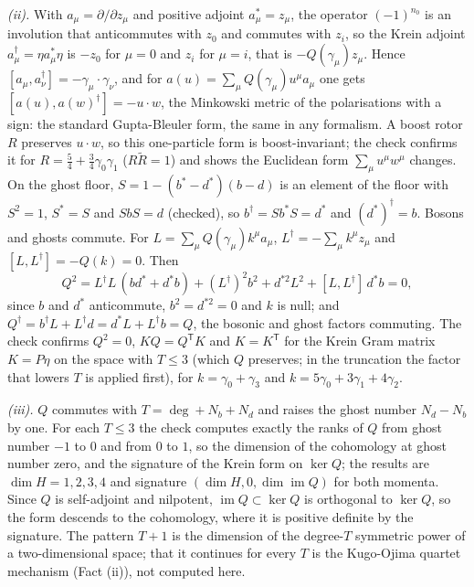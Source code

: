 \emph{(ii).} With $a_\mu = \partial/\partial z_\mu$ and positive adjoint $a_\mu^{*} = z_\mu$, the operator $(-1)^{n_0}$ is an involution that anticommutes with $z_0$ and commutes with $z_i$, so the Krein adjoint $a_\mu^{\dagger} = \eta a_\mu^{*}\eta$ is $-z_0$ for $\mu = 0$ and $z_i$ for $\mu = i$, that is $-Q(\gamma_{\mu})z_\mu$. Hence $[a_\mu, a_\nu^{\dagger}] = -\gamma_{\mu}\cdot\gamma_{\nu}$, and for $a(u) = \sum_\mu Q(\gamma_{\mu})u^\mu a_\mu$ one gets $[a(u), a(w)^{\dagger}] = -u\cdot w$, the Minkowski metric of the polarisations with a sign: the standard Gupta-Bleuler form, the same in any formalism. A boost rotor $R$ preserves $u\cdot w$, so this one-particle form is boost-invariant; the check confirms it for $R = \tfrac54 + \tfrac34\gamma_0\gamma_1$ ($R\tilde R = 1$) and shows the Euclidean form $\sum_\mu u^\mu w^\mu$ changes. On the ghost floor, $S = 1 - (b^{*} - d^{*})(b - d)$ is an element of the floor with $S^2 = 1$, $S^{*} = S$ and $SbS = d$ (checked), so $b^{\dagger} = Sb^{*}S = d^{*}$ and $(d^{*})^{\dagger} = b$. Bosons and ghosts commute. For $L = \sum_\mu Q(\gamma_{\mu})k^\mu a_\mu$, $L^{\dagger} = -\sum_\mu k^\mu z_\mu$ and $[L, L^{\dagger}] = -Q(k) = 0$. Then
\[
Q^2 = L^{\dagger}L\,(bd^{*} + d^{*}b) + (L^{\dagger})^2b^2 + d^{*2}L^2 + [L, L^{\dagger}]\,d^{*}b = 0,
\]
since $b$ and $d^{*}$ anticommute, $b^2 = d^{*2} = 0$ and $k$ is null; and $Q^{\dagger} = b^{\dagger}L + L^{\dagger}d = d^{*}L + L^{\dagger}b = Q$, the bosonic and ghost factors commuting. The check confirms $Q^2 = 0$, $KQ = Q^{\mathsf T}K$ and $K = K^{\mathsf T}$ for the Krein Gram matrix $K = P\eta$ on the space with $T \le 3$ (which $Q$ preserves; in the truncation the factor that lowers $T$ is applied first), for $k = \gamma_0 + \gamma_3$ and $k = 5\gamma_0 + 3\gamma_1 + 4\gamma_2$.

\emph{(iii).} $Q$ commutes with $T = \deg + N_b + N_d$ and raises the ghost number $N_d - N_b$ by one. For each $T \le 3$ the check computes exactly the ranks of $Q$ from ghost number $-1$ to $0$ and from $0$ to $1$, so the dimension of the cohomology at ghost number zero, and the signature of the Krein form on $\ker Q$; the results are $\dim H = 1, 2, 3, 4$ and signature $(\dim H, 0, \dim\operatorname{im}Q)$ for both momenta. Since $Q$ is self-adjoint and nilpotent, $\operatorname{im}Q \subset \ker Q$ is orthogonal to $\ker Q$, so the form descends to the cohomology, where it is positive definite by the signature. The pattern $T + 1$ is the dimension of the degree-$T$ symmetric power of a two-dimensional space; that it continues for every $T$ is the Kugo-Ojima quartet mechanism (Fact (ii)), not computed here.

